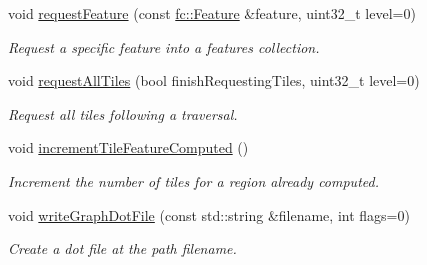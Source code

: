 \begin{DoxyCompactItemize}
$$void \hyperlink{classfi_1_1FastImage_abd44908134edad1df4a61faec9cdbf9e}{request\+Feature} (const \hyperlink{classfc_1_1Feature}{fc\+::\+Feature} \&feature, uint32\+\_\+t level=0)
\begin{DoxyCompactList}\small\item\em Request a specific feature into a features collection. \end{DoxyCompactList}\item 
void \hyperlink{classfi_1_1FastImage_a81c5c39784220efcebce2121a6552e53}{request\+All\+Tiles} (bool finish\+Requesting\+Tiles, uint32\+\_\+t level=0)
\begin{DoxyCompactList}\small\item\em Request all tiles following a traversal. \end{DoxyCompactList}\item 
void \hyperlink{classfi_1_1FastImage_a9778dab9f8a9ec5c834a00a9410f474a}{increment\+Tile\+Feature\+Computed} ()
\begin{DoxyCompactList}\small\item\em Increment the number of tiles for a region already computed. \end{DoxyCompactList}\item 
void \hyperlink{classfi_1_1FastImage_a79de6c7e6854a742c306d4ec5d942061}{write\+Graph\+Dot\+File} (const std\+::string \&filename, int flags=0)
\begin{DoxyCompactList}\small\item\em Create a dot file at the path filename. \end{DoxyCompactList}\end{DoxyCompactItemize}
